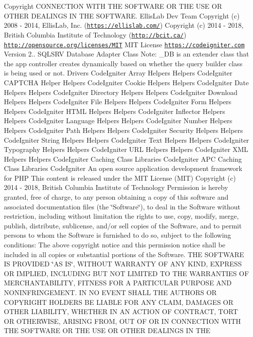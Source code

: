 \begin{DoxyCopyright}{Copyright}
C\+O\+N\+N\+E\+C\+T\+I\+ON W\+I\+TH T\+HE S\+O\+F\+T\+W\+A\+RE OR T\+HE U\+SE OR O\+T\+H\+ER D\+E\+A\+L\+I\+N\+GS IN T\+HE S\+O\+F\+T\+W\+A\+RE.  Ellis\+Lab Dev Team  Copyright (c) 2008 -\/ 2014, Ellis\+Lab, Inc. (\href{https://ellislab.com/}{\tt https\+://ellislab.\+com/})  Copyright (c) 2014 -\/ 2018, British Columbia Institute of Technology (\href{http://bcit.ca/}{\tt http\+://bcit.\+ca/})  \href{http://opensource.org/licenses/MIT}{\tt http\+://opensource.\+org/licenses/\+M\+IT} M\+IT License  \href{https://codeigniter.com}{\tt https\+://codeigniter.\+com}  Version 2..  S\+Q\+L\+S\+RV Database Adapter Class Note\+: \+\_\+\+DB is an extender class that the app controller creates dynamically based on whether the query builder class is being used or not.  Drivers Code\+Igniter Array Helpers  Helpers Code\+Igniter C\+A\+P\+T\+C\+HA Helper  Helpers Code\+Igniter Cookie Helpers  Helpers Code\+Igniter Date Helpers  Helpers Code\+Igniter Directory Helpers  Helpers Code\+Igniter Download Helpers  Helpers Code\+Igniter File Helpers  Helpers Code\+Igniter Form Helpers  Helpers Code\+Igniter H\+T\+ML Helpers  Helpers Code\+Igniter Inflector Helpers  Helpers Code\+Igniter Language Helpers  Helpers Code\+Igniter Number Helpers  Helpers Code\+Igniter Path Helpers  Helpers Code\+Igniter Security Helpers  Helpers Code\+Igniter String Helpers  Helpers Code\+Igniter Text Helpers  Helpers Code\+Igniter Typography Helpers  Helpers Code\+Igniter U\+RL Helpers  Helpers Code\+Igniter X\+ML Helpers  Helpers Code\+Igniter Caching Class  Libraries Code\+Igniter A\+PC Caching Class  Libraries Code\+Igniter An open source application development framework for P\+HP This content is released under the M\+IT License (M\+IT) Copyright (c) 2014 -\/ 2018, British Columbia Institute of Technology Permission is hereby granted, free of charge, to any person obtaining a copy of this software and associated documentation files (the \char`\"{}\+Software\char`\"{}), to deal in the Software without restriction, including without limitation the rights to use, copy, modify, merge, publish, distribute, sublicense, and/or sell copies of the Software, and to permit persons to whom the Software is furnished to do so, subject to the following conditions\+: The above copyright notice and this permission notice shall be included in all copies or substantial portions of the Software. T\+HE S\+O\+F\+T\+W\+A\+RE IS P\+R\+O\+V\+I\+D\+ED \char`\"{}\+A\+S I\+S\char`\"{}, W\+I\+T\+H\+O\+UT W\+A\+R\+R\+A\+N\+TY OF A\+NY K\+I\+ND, E\+X\+P\+R\+E\+SS OR I\+M\+P\+L\+I\+ED, I\+N\+C\+L\+U\+D\+I\+NG B\+UT N\+OT L\+I\+M\+I\+T\+ED TO T\+HE W\+A\+R\+R\+A\+N\+T\+I\+ES OF M\+E\+R\+C\+H\+A\+N\+T\+A\+B\+I\+L\+I\+TY, F\+I\+T\+N\+E\+SS F\+OR A P\+A\+R\+T\+I\+C\+U\+L\+AR P\+U\+R\+P\+O\+SE A\+ND N\+O\+N\+I\+N\+F\+R\+I\+N\+G\+E\+M\+E\+NT. IN NO E\+V\+E\+NT S\+H\+A\+LL T\+HE A\+U\+T\+H\+O\+RS OR C\+O\+P\+Y\+R\+I\+G\+HT H\+O\+L\+D\+E\+RS BE L\+I\+A\+B\+LE F\+OR A\+NY C\+L\+A\+IM, D\+A\+M\+A\+G\+ES OR O\+T\+H\+ER L\+I\+A\+B\+I\+L\+I\+TY, W\+H\+E\+T\+H\+ER IN AN A\+C\+T\+I\+ON OF C\+O\+N\+T\+R\+A\+CT, T\+O\+RT OR O\+T\+H\+E\+R\+W\+I\+SE, A\+R\+I\+S\+I\+NG F\+R\+OM, O\+UT OF OR IN C\+O\+N\+N\+E\+C\+T\+I\+ON W\+I\+TH T\+HE S\+O\+F\+T\+W\+A\+RE OR T\+HE U\+SE OR O\+T\+H\+ER D\+E\+A\+L\+I\+N\+GS IN T\+HE 
\end{DoxyCopyright}
